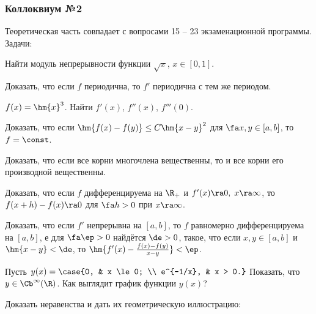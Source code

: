 \documentclass[a4paper]{article}
\begin{document}
\subsubsection{Коллоквиум №2}

Теоретическая часть совпадает с вопросами 15 -- 23 экзаменационной программы. Задачи:
\setcounter{problem}{0}
\begin{problem}
Найти модуль непрерывности функции $\sqrt{x}$, $x \in [0,1]$.
\end{problem}

\begin{problem}
Доказать, что если $f$ периодична, то $f'$ периодична с тем же периодом.
\end{problem}

\begin{problem}
$f(x) = \hm{x}^3$. Найти $f'(x)$, $f''(x)$, $f'''(0)$.
\end{problem}

\begin{problem}
Доказать, что если $\hm{f(x)-f(y)} \le C \hm{x-y}^2$ для $\fa x,y \in [a,b]$, то $f = \const$.
\end{problem}

\begin{problem}
Доказать, что если все корни многочлена вещественны, то и все корни его производной вещественны.
\end{problem}

\begin{problem}
Доказать, что если $f$ дифференцируема на $\R_+$ и $f'(x) \ra 0, \; x \ra \infty$, то
$f(x+h)-f(x) \ra 0$ для $\fa h > 0$ при $x \ra \infty$.
\end{problem}

\begin{problem}
Доказать, что если $f'$ непрерывна на $[a,b]$, то $f$ равномерно дифференцируема на $[a,b]$, е
для $\fa \ep > 0$ найдётся $\de > 0$, такое, что если $x,y \in [a,b]$ и $\hm{x-y} < \de$,
то $\hm{f'(x)-\frac{f(x)-f(y)}{x-y}} < \ep$.
\end{problem}

\begin{problem}
Пусть $y(x)=\case{0, & x \le 0; \\ e^{-1/x}, & x > 0.}$ Показать, что $y \in \Cb^\infty(\R)$. Как выглядит график
функции $y(x)$?
\end{problem}

\begin{problem}
Доказать неравенства и дать их геометрическую иллюстрацию:
\end{problem}
\end{document}
